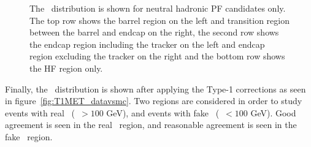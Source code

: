 \begin{figure}[!htb]
\begin{center}
    \caption{
      \label{fig:nupfcands}
      The \MET\ distribution is shown for neutral hadronic PF candidates only.
      The top row shows the barrel region on the left and transition region between the barrel and endcap on the right,
      the second row shows the endcap region including the tracker on the left and endcap region excluding the tracker on the right
      and the bottom row shows the HF region only.
    }
  \end{center}
\end{figure}

\clearpage

Finally, the \MET\ distribution is shown after applying the Type-1 corrections as seen in figure~\ref{fig:T1MET_datavsmc}.
Two regions are considered in order to study events with real \MET\ (\MET\ $> 100$ GeV),
and events with fake \MET\ (\MET\ $< 100$ GeV). 
Good agreement is seen in the real \MET\ region,
and reasonable agreement is seen in the fake \MET\ region.

